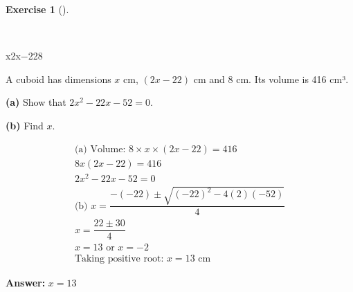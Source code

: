 \documentclass[
  letterpaper,
  DIV=11,
  numbers=noendperiod]{scrreprt}
\theoremstyle{definition}
\newtheorem{exercise}{Exercise}[chapter]
\theoremstyle{remark}
\begin{document}
\begin{exercise}[]\protect\hypertarget{exr-u6-32-1}{}\label{exr-u6-32-1}

~

x2x−228

A cuboid has dimensions \(x\) cm, \((2x - 22)\) cm and \(8\) cm. Its
volume is 416 cm³.

\textbf{(a)} Show that \(2x^2 - 22x - 52 = 0\).

\textbf{(b)} Find \(x\).

\begin{tcolorbox}[enhanced jigsaw, opacitybacktitle=0.6, coltitle=black, arc=.35mm, colframe=quarto-callout-tip-color-frame, colback=white, bottomrule=.15mm, left=2mm, colbacktitle=quarto-callout-tip-color!10!white, titlerule=0mm, opacityback=0, title=\textcolor{quarto-callout-tip-color}{\faLightbulb}\hspace{0.5em}{🔍 View Solution}, leftrule=.75mm, breakable, rightrule=.15mm, bottomtitle=1mm, toptitle=1mm, toprule=.15mm]

\begin{align*}
\text{(a) Volume: } 8 \times x \times (2x-22) = 416 \\ 8x(2x-22) = 416 \\ 2x^2 - 22x - 52 = 0 \\ \text{(b) } x = \dfrac{-(-22) \pm \sqrt{(-22)^2 - 4(2)(-52)}}{4} \\ x = \dfrac{22 \pm 30}{4} \\ x = 13 \text{ or } x = -2 \\ \text{Taking positive root: } x = 13 \text{ cm}
\end{align*}

\textbf{Answer:} \(x = 13\)

\end{tcolorbox}

\end{exercise}
\end{document}
